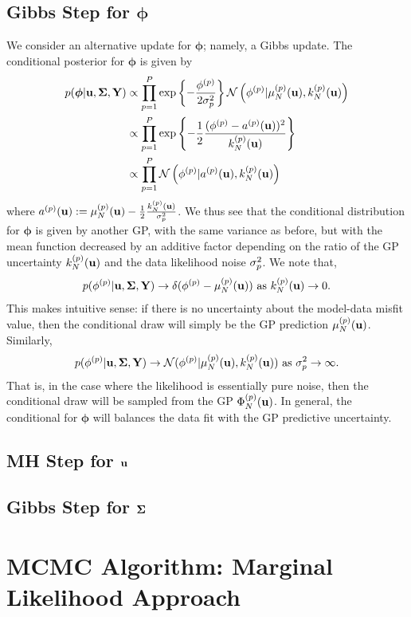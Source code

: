 \documentclass[12pt]{article}
\newcommand{\bphi}{\boldsymbol{\phi}}
\begin{document}
\subsection{Gibbs Step for $\bphi$}
We consider an alternative update for $\bphi$; namely, a Gibbs update. The conditional posterior for $\bphi$ is given by 
\begin{align*}
p(\bphi | \bpar, \CovObs, \stateMat) 
&\propto \prod_{\objIdx=1}^{\Nobj} \exp\left\{-\frac{\indexObj{\phi}}{2\sdObs^2_{\objIdx}} \right\} 
	\Gaussian\left(\indexObj{\phi} | \GPMeanPredOut{\Ndesign}{\objIdx}(\bpar), \GPKerPredOut{\Ndesign}{\objIdx}(\bpar)\right) \\
&\propto \prod_{\objIdx=1}^{\Nobj} \exp\left\{-\frac{1}{2} \frac{(\indexObj{\phi} - \indexObj{a}(\bpar))^2}{\GPKerPredOut{\Ndesign}{\objIdx}(\bpar)} \right\} \\
&\propto \prod_{\objIdx=1}^{\Nobj} \Gaussian\left(\indexObj{\phi} | \indexObj{a}(\bpar), \GPKerPredOut{\Ndesign}{\objIdx}(\bpar)\right)
\end{align*}
where ${a}^{(p)}(\mathbf{u}) := \mu_{N}^{(p)}(\mathbf{u}) - \frac{1}{2}\frac{k_{N}^{(p)}(\mathbf{u})}{\sigma^2_{p}}$. We thus see that 
the conditional distribution for $\bphi$ is given by another GP, with the same variance as before, but with the mean function decreased by an additive factor depending on the 
ratio of the GP uncertainty $k_{N}^{(p)}(\mathbf{u})$ and the data likelihood noise $\sigma^2_{p}$. We note that, 
\begin{align*}
p({\phi}^{(p)} | \mathbf{u}, \boldsymbol{\Sigma}, \mathbf{Y}) \to \delta({\phi}^{(p)} - \mu_{N}^{(p)}(\mathbf{u})) \text{ as } k_{N}^{(p)}(\mathbf{u}) \to 0.
\end{align*}
This makes intuitive sense: if there is no uncertainty about the model-data misfit value, then the conditional draw will simply be the GP prediction $\mu_{N}^{(p)}(\mathbf{u})$.
Similarly, 
\begin{align*}
p({\phi}^{(p)} | \mathbf{u}, \boldsymbol{\Sigma}, \mathbf{Y}) \to \mathcal{N}({\phi}^{(p)}|\mu_{N}^{(p)}(\mathbf{u}) , k_{N}^{(p)}(\mathbf{u})) \text{ as } \sigma^2_{p} \to \infty.
\end{align*}
That is, in the case where the likelihood is essentially pure noise, then the conditional draw will be sampled from the GP $\Phi_{N}^{(p)}(\mathbf{u})$. In general, the 
conditional for $\bphi$ will balances the data fit with the GP predictive uncertainty. 

\subsection{MH Step for $\mathbf{u}$}



\subsection{Gibbs Step for $\boldsymbol{\Sigma}$}




\section{MCMC Algorithm: Marginal Likelihood Approach}
\end{document}
